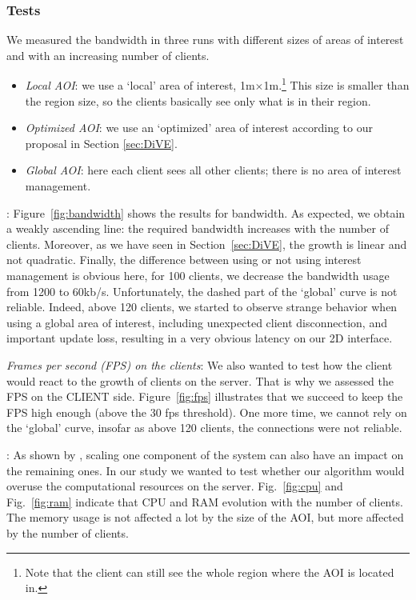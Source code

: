 \documentclass[]{elsarticle}
\begin{document}
\subsubsection{Tests}

We measured the bandwidth in three runs with different sizes of areas of interest and with an increasing number of clients.
\begin{itemize}
\item \emph{Local AOI\/}: we use a `local' area of interest, 1m$\times$1m.\footnote{Note that the client can still see the whole region where the AOI is located in.}  This size is smaller than the region size, so the clients basically see only what is in their region.
\item \emph{Optimized AOI\/}: we use an `optimized' area of interest according to our proposal in Section \ref{sec:DiVE}.
\item \emph{Global AOI\/}: here each client sees all other clients; there is no area of interest management.
\end{itemize}


: Figure~\ref{fig:bandwidth} shows the results for bandwidth. As expected, we obtain a weakly ascending line: the required bandwidth increases with the number of clients. Moreover, as we have seen in Section~\ref{sec:DiVE}, the growth is linear and not quadratic. Finally, the difference between using or not using interest management is obvious here, for 100 clients, we decrease the bandwidth usage from 1200 to 60kb/s. Unfortunately, the dashed part of the `global' curve is not reliable. Indeed, above 120 clients, we started to observe strange behavior when using a global area of interest, including unexpected client disconnection, and important update loss, resulting in a very obvious latency on our 2D interface.

\vspace{1.5ex}
\noindent
{\itshape Frames per second (FPS) on the clients\/}: We also wanted to test how the client would react to the growth of clients on the server. That is why we assessed the FPS on the CLIENT side. Figure~\ref{fig:fps} illustrates that we succeed to keep the FPS high enough (above the 30 fps threshold). One more time, we cannot rely on the `global' curve, insofar as above 120 clients, the connections were not reliable.

\vspace{1.5ex}
: As shown by \cite{Lake+others.2010}, scaling one component of the system can also have an impact on the remaining ones. In our study we wanted to test whether our algorithm would overuse the computational resources on the server. Fig.~\ref{fig:cpu} and Fig.~\ref{fig:ram} indicate that CPU and RAM evolution with the number of clients. The memory usage is not affected a lot by the size of the AOI, but more affected by the number of clients.
\end{document}
